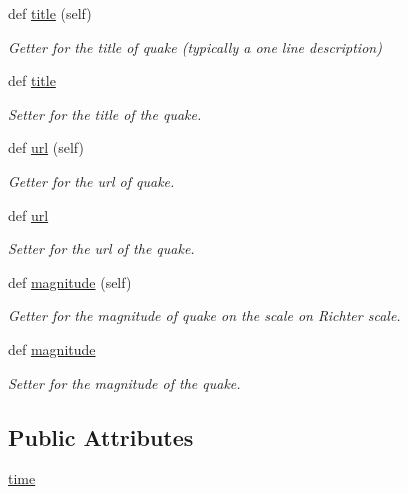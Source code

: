 \begin{DoxyCompactItemize}
def \hyperlink{classbridges_1_1data__src__dependent_1_1earthquake__usgs_1_1_earthquake_u_s_g_s_a7b46d73e199b4cf4f9b1253f89727abe}{title} (self)
\begin{DoxyCompactList}\small\item\em Getter for the title of quake (typically a one line description) \end{DoxyCompactList}\item 
def \hyperlink{classbridges_1_1data__src__dependent_1_1earthquake__usgs_1_1_earthquake_u_s_g_s_a8aa7ec15933f9416f84367a38a192575}{title}
\begin{DoxyCompactList}\small\item\em Setter for the title of the quake. \end{DoxyCompactList}\item 
def \hyperlink{classbridges_1_1data__src__dependent_1_1earthquake__usgs_1_1_earthquake_u_s_g_s_a449a372a14b288f7fd71066fb3886cd1}{url} (self)
\begin{DoxyCompactList}\small\item\em Getter for the url of quake. \end{DoxyCompactList}\item 
def \hyperlink{classbridges_1_1data__src__dependent_1_1earthquake__usgs_1_1_earthquake_u_s_g_s_afc4af59842186d2f0198b3e6d0690a95}{url}
\begin{DoxyCompactList}\small\item\em Setter for the url of the quake. \end{DoxyCompactList}\item 
def \hyperlink{classbridges_1_1data__src__dependent_1_1earthquake__usgs_1_1_earthquake_u_s_g_s_a2ada4ba221f09e4fd249ba53f5647d61}{magnitude} (self)
\begin{DoxyCompactList}\small\item\em Getter for the magnitude of quake on the scale on Richter scale. \end{DoxyCompactList}\item 
def \hyperlink{classbridges_1_1data__src__dependent_1_1earthquake__usgs_1_1_earthquake_u_s_g_s_a103f7a3eee708e299c73d79843fd2187}{magnitude}
\begin{DoxyCompactList}\small\item\em Setter for the magnitude of the quake. \end{DoxyCompactList}\end{DoxyCompactItemize}
\subsection*{Public Attributes}
\begin{DoxyCompactItemize}
\item 
\hyperlink{classbridges_1_1data__src__dependent_1_1earthquake__usgs_1_1_earthquake_u_s_g_s_aacc317fa18e83353df6c8ffb3d47d6c1}{time}
\end{DoxyCompactItemize}


